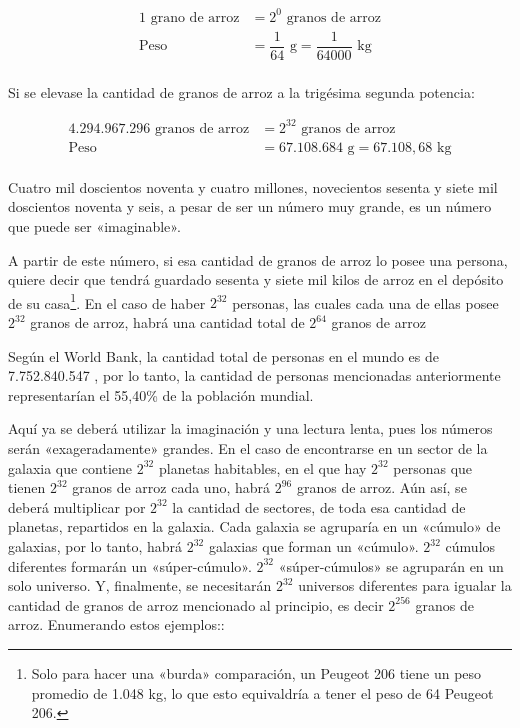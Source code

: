 \documentclass[12pt,a4paper,twoside]{book}
\begin{document}
\begin{align*}
1 \text{ grano de arroz} &= 2^{0} \text{ granos de arroz}  \\
\text{Peso} &= \dfrac{1}{64} \text{ g} = \dfrac{1}{64000} \text{ kg} \\
\end{align*}

Si se elevase la cantidad de granos de arroz a la trigésima segunda potencia:

\begin{align*}
4.294.967.296 \text{ granos de arroz} &= 2^{32} \text{ granos de arroz} \\
\text{Peso} &= 67.108.684 \text{ g} = 67.108,68 \text{ kg} \\
\end{align*}

Cuatro mil doscientos noventa y cuatro millones, novecientos sesenta y siete mil doscientos noventa y seis, a pesar de ser un número muy grande, es un número que puede ser «imaginable».

A partir de este número, si esa cantidad de granos de arroz lo posee una persona, quiere decir que tendrá guardado sesenta y siete mil kilos de arroz en el depósito de su casa\footnote{Solo para hacer una «burda» comparación, un Peugeot 206 tiene un peso promedio de 1.048 kg, lo que esto equivaldría a tener el peso de 64 Peugeot 206.}. En el caso de haber $ 2^{32} $ personas, las cuales cada una de ellas posee $ 2^{32} $ granos de arroz, habrá una cantidad total de $ 2^{64} $ granos de arroz

Según el World Bank, la cantidad total de personas en el mundo es de 7.752.840.547 \cite{wb:pobl-mundial}, por lo tanto, la cantidad de personas mencionadas anteriormente representarían el 55,40\% de la población mundial.

Aquí ya se deberá utilizar la imaginación y una lectura lenta, pues los números serán «exageradamente» grandes. En el caso de encontrarse en un sector de la galaxia que contiene $ 2^{32} $ planetas habitables, en el que hay $ 2^{32} $ personas que tienen $ 2^{32} $ granos de arroz cada uno, habrá $ 2^{96} $ granos de arroz. Aún así, se deberá multiplicar por $ 2^{32} $ la cantidad de sectores, de toda esa cantidad de planetas, repartidos en la galaxia. Cada galaxia se agruparía en un «cúmulo» de galaxias, por lo tanto, habrá $ 2^{32} $ galaxias que forman un «cúmulo». $ 2^{32} $ cúmulos diferentes formarán un «súper-cúmulo». $ 2^{32} $ «súper-cúmulos» se agruparán en un solo universo. Y, finalmente, se necesitarán $ 2^{32} $ universos diferentes para igualar la cantidad de granos de arroz mencionado al principio, es decir $ 2^{256} $ granos de arroz. Enumerando estos ejemplos::
\end{document}
